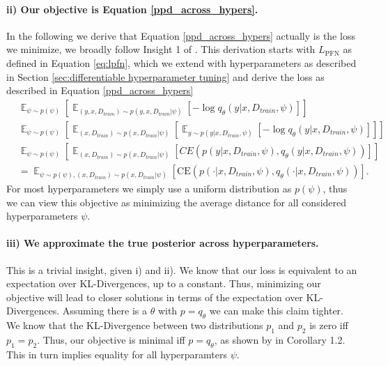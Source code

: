 \documentclass{article}
\DeclareMathOperator*{\E}{\mathbb{E}}
\begin{document}
\paragraph{ii) Our objective is Equation \ref{ppd_across_hypers}.}
In the following we derive that Equation \ref{ppd_across_hypers} actually is the loss we minimize, we broadly follow Insight 1 of \citet{muller-iclr2022}. This derivation starts with $L_{\text{PFN}}$ as defined in Equation \ref{eq:lpfn}, which we extend with hyperparameters as described in Section \ref{sec:differentiable hyperparameter tuning} and derive the loss as described in Equation \ref{ppd_across_hypers}
\begin{align}
	&\E_{\psi \sim p(\psi)}\left[ \E_{(y,x,D_{train}) \sim p(y,x,D_{train}|\psi)}\left[  -\log q_\theta(y|x,D_{train},\psi)\right]\right]\\
	&\E_{\psi \sim p(\psi)}\left[ \E_{(x,D_{train}) \sim p(x,D_{train}|\psi)} \left[ \E_{y \sim p(y|x,D_{train},\psi)}\left[  -\log q_\theta(y|x,D_{train},\psi)\right]\right]\right]\\
	&\E_{\psi \sim p(\psi)}\left[ \E_{(x,D_{train}) \sim p(x,D_{train}|\psi)} \left[ CE(p(y|x,D_{train},\psi),q_\theta(y|x,D_{train},\psi))\right]\right]\\
	&=\E_{\psi \sim p(\psi), (x,D_{train}) \sim p(x,D_{train}|\psi)} \left[\text{CE} \left(p(\cdot|x,D_{train},\psi),q_\theta(\cdot|x,D_{train},\psi)\right)\right].
\end{align}
For most hyperparameters we simply use a uniform distribution as $p(\psi)$, thus we can view this objective as minimizing the average distance for all considered hyperparameters $\psi$.
\paragraph{iii) We approximate the true posterior across hyperparameters.}
This is a trivial insight, given i) and ii).
We know that our loss is equivalent to an expectation over KL-Divergences, up to a constant.
Thus, minimizing our objective will lead to closer solutions in terms of the expectation over KL-Divergences.
Assuming there is a $\theta$ with $p=q_\theta$ we can make this claim tighter.
We know that the KL-Divergence between two distributions $p_1$ and $p_2$ is zero iff $p_1 = p_2$.
Thus, our objective is minimal iff $p=q_\theta$, as shown by \citet{muller-iclr2022} in Corollary 1.2.
This in turn implies equality for all hyperparamters $\psi$.


\def \numdraws {\textit{num\_draws}}
\def \numsteps {\textit{num\_steps}}
\end{document}
